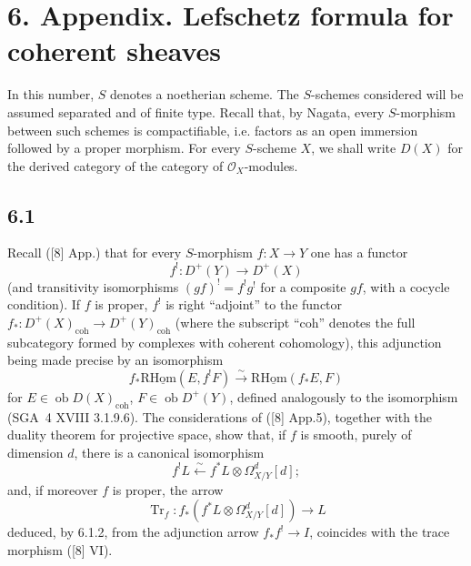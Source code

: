 \documentclass[11pt]{article}
\providecommand{\cO}{\mathcal{O}}
\begin{document}
\section*{6. Appendix. Lefschetz formula for coherent sheaves}

In this number, $S$ denotes a noetherian scheme. The $S$-schemes considered will be assumed separated and of finite type. Recall that, by Nagata, every $S$-morphism between such schemes is compactifiable, i.e. factors as an open immersion followed by a proper morphism. For every $S$-scheme $X$, we shall write $D(X)$ for the derived category of the category of $\cO_X$-modules.

\subsection*{6.1}
Recall ([8] App.) that for every $S$-morphism $f:X\to Y$ one has a functor
\[
f^!:D^+(Y)\longrightarrow D^+(X)
\]
(and transitivity isomorphisms $(gf)^! = f^!g^!$ for a composite $gf$, with a cocycle condition). If $f$ is proper, $f^!$ is right ``adjoint'' to the functor $f_*:D^+(X)_{\mathrm{coh}}\to D^+(Y)_{\mathrm{coh}}$ (where the subscript ``coh'' denotes the full subcategory formed by complexes with coherent cohomology), this adjunction being made precise by an isomorphism
\begin{equation}
\tag{6.1.1}
f_*\mathrm{R}\underline{\mathrm{Hom}}(E,f^!F)\xrightarrow{\sim}\mathrm{R}\underline{\mathrm{Hom}}(f_*E,F)
\end{equation}
for $E\in\operatorname{ob}D(X)_{\mathrm{coh}}$, $F\in\operatorname{ob}D^+(Y)$, defined analogously to the isomorphism (SGA~4 XVIII 3.1.9.6). The considerations of ([8] App.5), together with the duality theorem for projective space, show that, if $f$ is smooth, purely of dimension $d$, there is a canonical isomorphism
\begin{equation}
\tag{6.1.2}
f^!L\xleftarrow{\sim} f^*L\otimes\Omega^d_{X/Y}[d];
\end{equation}
and, if moreover $f$ is proper, the arrow
\begin{equation}
\tag{6.1.3}
\operatorname{Tr}_f:f_*(f^*L\otimes\Omega^d_{X/Y}[d])\longrightarrow L
\end{equation}
deduced, by 6.1.2, from the adjunction arrow $f_*f^!\to I$, coincides with the trace morphism ([8] VI).
\end{document}
